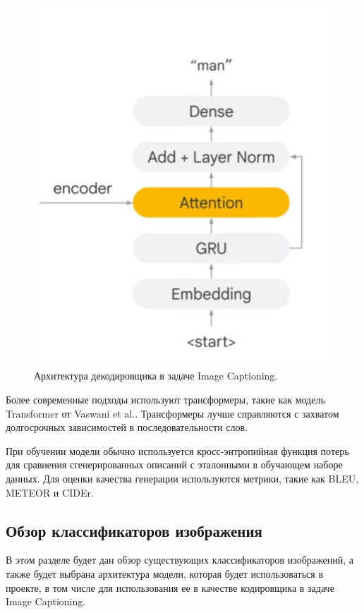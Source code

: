 \documentclass[a4paper,12pt]{extarticle}
\begin{document}
\begin{figure}[ht]
	\centering
	\includegraphics[scale=0.25]{image-captioning-decoder.png}
	\caption{Архитектура декодировщика в задаче Image Captioning.}
	\label{fig:image-captioning-decoder}
\end{figure}

Более современные подходы используют трансформеры, такие как модель Transformer от Vaswani et al.\cite{transformers}. Трансформеры лучше справляются с захватом долгосрочных зависимостей в последовательности слов.

При обучении модели обычно используется кросс-энтропийная функция потерь для сравнения сгенерированных описаний с эталонными в обучающем наборе данных. Для оценки качества генерации используются метрики, такие как BLEU, METEOR и CIDEr.

\subsection{Обзор классификаторов изображения}

В этом разделе будет дан обзор существующих классификаторов изображений, а также будет выбрана архитектура модели, которая будет использоваться в проекте, в том числе для использования ее в качестве кодировщика в задаче Image Captioning.
 
\end{document}
